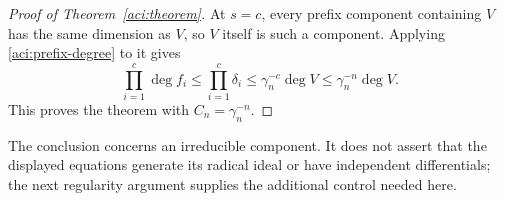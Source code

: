 \begin{proof}[Proof of Theorem~\ref{aci:theorem}]
At $s=c$, every prefix component containing $V$ has the same dimension
as $V$, so $V$ itself is such a component.  Applying
\eqref{aci:prefix-degree} to it gives
\[
 \prod_{i=1}^c\deg f_i
 \le\prod_{i=1}^c\delta_i
 \le\gamma_n^{-c}\deg V
 \le\gamma_n^{-n}\deg V.
\]
This proves the theorem with $C_n=\gamma_n^{-n}$.
\end{proof}

The conclusion concerns an irreducible component.  It does not assert
that the displayed equations generate its radical ideal or have
independent differentials; the next regularity argument supplies the
additional control needed here.
